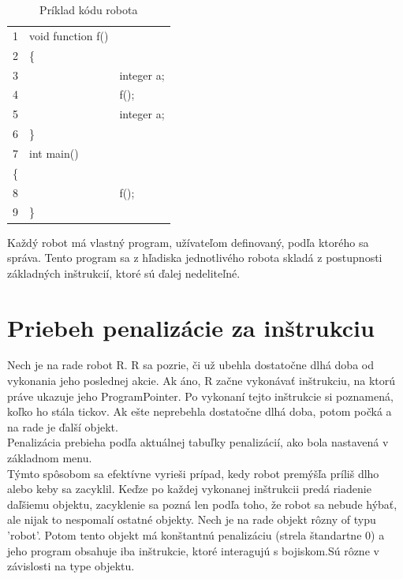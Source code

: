 \begin{table}
\centering
\begin{tabular}{| lll |}
\hline
1&void function f()\\
2&\{\\
3&&integer a;\\
4&&f();\\
5&&integer a;\\
6&\}\\
7&int main()\\
\{\\
8&&	f();\\
9&\}\\
\hline
\end{tabular}
\caption{ Príklad kódu robota }
\label{tab:rek}
\end{table}

Každý robot má vlastný program, užívateľom definovaný, podľa ktorého sa správa. Tento program sa z hľadiska jednotlivého robota skladá z postupnosti základných inštrukcií, ktoré sú ďalej nedeliteľné. 

\section{Priebeh penalizácie za inštrukciu}

\begin{definicia}
\end{definicia}

Nech je na rade robot R. R sa pozrie, či už ubehla dostatočne dlhá doba od vykonania jeho poslednej akcie. Ak áno, R začne vykonávať inštrukciu, na ktorú práve ukazuje jeho ProgramPointer. Po vykonaní tejto inštrukcie si poznamená, koľko ho stála tickov. Ak ešte neprebehla dostatočne dlhá doba, potom počká a na rade je ďalší objekt. \\
Penalizácia prebieha podľa aktuálnej tabuľky penalizácií, ako bola nastavená v základnom menu. \\

Týmto spôsobom sa efektívne vyrieši prípad, kedy robot premýšľa príliš dlho alebo keby sa zacyklil. Keďze po každej vykonanej inštrukcii predá riadenie daľšiemu objektu, zacyklenie sa pozná len podľa toho, že robot sa nebude hýbať, ale nijak to nespomalí ostatné objekty.%
\newline
Nech je na rade objekt rôzny of typu 'robot'. Potom tento objekt má konštantnú penalizáciu (strela štandartne 0) a jeho program obsahuje iba inštrukcie, ktoré interagujú s bojiskom.Sú rôzne v závislosti na type objektu.

